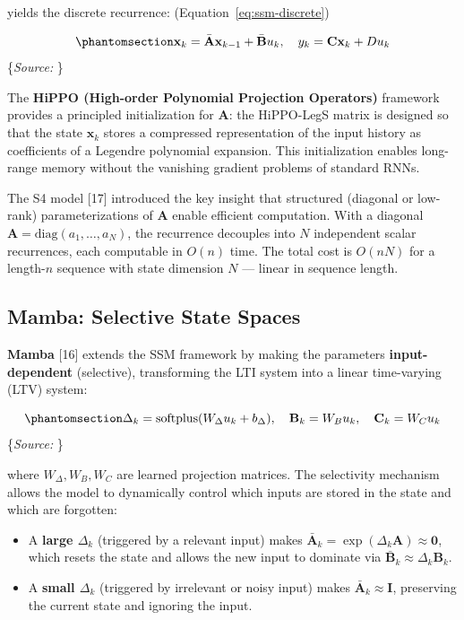 \documentclass[
  english,
  12pt,
  12pt,
  a4paper,
  oneside]{report}
\providecommand{\tightlist}{%
  \setlength{\itemsep}{0pt}\setlength{\parskip}{0pt}}
\begin{document}
yields the discrete recurrence: (Equation~\ref{eq:ssm-discrete})

\begin{equation}\protect\phantomsection\label{eq:ssm-discrete}{\mathbf{x}_k = \bar{\mathbf{A}} \mathbf{x}_{k-1} + \bar{\mathbf{B}} u_k, \quad y_k = \mathbf{C} \mathbf{x}_k + D u_k
}\end{equation} \footnotesize\{\textit{Source: \1}\}\normalsize

The \textbf{HiPPO (High-order Polynomial Projection Operators)} framework provides a principled initialization for \(\mathbf{A}\): the HiPPO-LegS matrix is designed so that the state \(\mathbf{x}_k\) stores a compressed representation of the input history as coefficients of a Legendre polynomial expansion. This initialization enables long-range memory without the vanishing gradient problems of standard RNNs.

The S4 model {[}17{]} introduced the key insight that structured (diagonal or low-rank) parameterizations of \(\mathbf{A}\) enable efficient computation. With a diagonal \(\mathbf{A} = \text{diag}(a_1, \dots, a_N)\), the recurrence decouples into \(N\) independent scalar recurrences, each computable in \(O(n)\) time. The total cost is \(O(nN)\) for a length-\(n\) sequence with state dimension \(N\) --- linear in sequence length.

\subsection{Mamba: Selective State Spaces}\label{sec:mamba-selective-state-spaces}

\textbf{Mamba} {[}16{]} extends the SSM framework by making the parameters \textbf{input-dependent} (selective), transforming the LTI system into a linear time-varying (LTV) system:

\begin{equation}\protect\phantomsection\label{eq:mamba-selective}{\Delta_k = \text{softplus}(W_\Delta u_k + b_\Delta), \quad \mathbf{B}_k = W_B u_k, \quad \mathbf{C}_k = W_C u_k
}\end{equation} \footnotesize\{\textit{Source: \1}\}\normalsize

where \(W_\Delta, W_B, W_C\) are learned projection matrices. The selectivity mechanism allows the model to dynamically control which inputs are stored in the state and which are forgotten:

\begin{itemize}
\tightlist
\item
  A \textbf{large \(\Delta_k\)} (triggered by a relevant input) makes \(\bar{\mathbf{A}}_k = \exp(\Delta_k \mathbf{A}) \approx \mathbf{0}\), which resets the state and allows the new input to dominate via \(\bar{\mathbf{B}}_k \approx \Delta_k \mathbf{B}_k\).
\item
  A \textbf{small \(\Delta_k\)} (triggered by irrelevant or noisy input) makes \(\bar{\mathbf{A}}_k \approx \mathbf{I}\), preserving the current state and ignoring the input.
\end{itemize}
\end{document}
